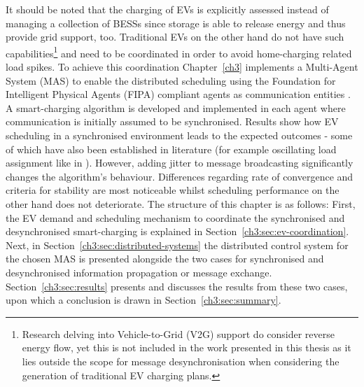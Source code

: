 It should be noted that the charging of EVs is explicitly assessed instead of managing a collection of BESSs since storage is able to release energy and thus provide grid support, too.
Traditional EVs on the other hand do not have such capabilities\footnote{Research delving into Vehicle-to-Grid (V2G) support do consider reverse energy flow, yet this is not included in the work presented in this thesis as it lies outside the scope for message desynchronisation when considering the generation of traditional EV charging plans.} and need to be coordinated in order to avoid home-charging related load spikes.
To achieve this coordination Chapter~\ref{ch3} implements a Multi-Agent System (MAS) to enable the distributed scheduling using the Foundation for Intelligent Physical Agents (FIPA) compliant agents as communication entities \cite{FIPA-website}.
A smart-charging algorithm is developed and implemented in each agent where communication is initially assumed to be synchronised.
Results show how EV scheduling in a synchronised environment leads to the expected outcomes - some of which have also been established in literature (for example oscillating load assignment like in \cite{Karfopoulos2013}).
However, adding jitter to message broadcasting significantly changes the algorithm's behaviour.
Differences regarding rate of convergence and criteria for stability are most noticeable whilst scheduling performance on the other hand does not deteriorate.
The structure of this chapter is as follows:
First, the EV demand and scheduling mechanism to coordinate the synchronised and desynchronised smart-charging is explained in Section~\ref{ch3:sec:ev-coordination}.
Next, in Section~\ref{ch3:sec:distributed-systems} the distributed control system for the chosen MAS is presented alongside the two cases for synchronised and desynchronised information propagation or message exchange.
Section~\ref{ch3:sec:results} presents and discusses the results from these two cases, upon which a conclusion is drawn in Section~\ref{ch3:sec:summary}.
